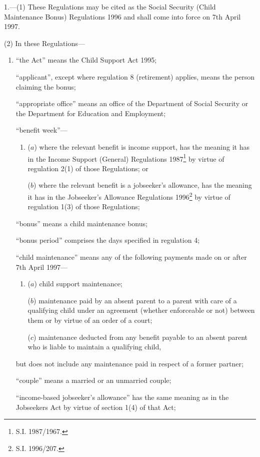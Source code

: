 \documentclass[a4paper]{article}
\begin{document}
1.—(1) These Regulations may be cited as the Social Security (Child Maintenance Bonus) Regulations 1996 and shall come into force on 7th April 1997.

(2) In these Regulations—
\begin{enumerate}\item[]
“the Act” means the Child Support Act 1995;

“applicant”, except where regulation 8 (retirement) applies, means the person claiming the bonus;

“appropriate office” means an office of the Department of Social Security or the Department for Education and Employment;

“benefit week”—
\begin{enumerate}\item[]
($a$) where the relevant benefit is income support, has the meaning it has in the Income Support (General) Regulations 1987\footnote{\frenchspacing S.I. 1987/1967.} by virtue of regulation 2(1) of those Regulations; or

($b$) where the relevant benefit is a jobseeker’s allowance, has the meaning it has in the Jobseeker’s Allowance Regulations 1996\footnote{\frenchspacing S.I. 1996/207.} by virtue of regulation 1(3) of those Regulations;
\end{enumerate}

“bonus” means a child maintenance bonus;

“bonus period” comprises the days specified in regulation 4;

“child maintenance” means any of the following payments made on or after 7th April 1997—
\begin{enumerate}\item[]
($a$) child support maintenance;

($b$) maintenance paid by an absent parent to a parent with care of a qualifying child under an agreement (whether enforceable or not) between them or by virtue of an order of a court;

($c$) maintenance deducted from any benefit payable to an absent parent who is liable to maintain a qualifying child,
\end{enumerate}
but does not include any maintenance paid in respect of a former partner;

“couple” means a married or an unmarried couple;

“income-based jobseeker’s allowance” has the same meaning as in the Jobseekers Act by virtue of section 1(4) of that Act;


\end{enumerate}
\end{document}

